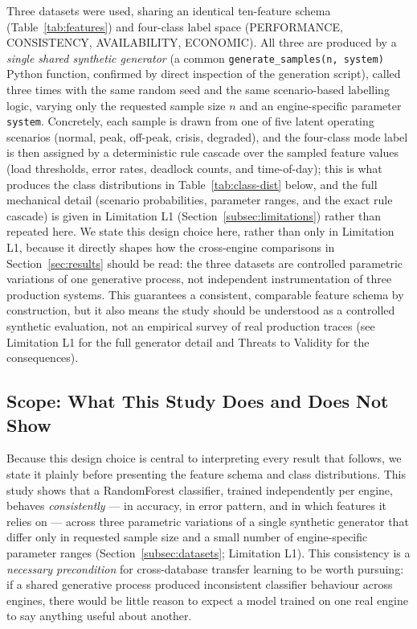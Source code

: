 \documentclass[iicol,pdflatex,sn-mathphys-num]{sn-jnl}
\theoremstyle{thmstyleone}
\theoremstyle{thmstylethree}
\begin{document}
Three datasets were used, sharing an identical ten-feature schema
(Table~\ref{tab:features}) and four-class label space (PERFORMANCE,
CONSISTENCY, AVAILABILITY, ECONOMIC). All three are produced by a
\emph{single shared synthetic generator} (a common
\texttt{generate\_samples(n, system)} Python function, confirmed by
direct inspection of the generation script), called three times with
the same random seed and the same scenario-based labelling logic,
varying only the requested sample size $n$ and an engine-specific
parameter \texttt{system}. Concretely, each sample is drawn from one
of five latent operating scenarios (normal, peak, off-peak, crisis,
degraded), and the four-class mode label is then assigned by a
deterministic rule cascade over the sampled feature values (load
thresholds, error rates, deadlock counts, and time-of-day); this is
what produces the class distributions in Table~\ref{tab:class-dist}
below, and the full mechanical detail (scenario probabilities,
parameter ranges, and the exact rule cascade) is given in Limitation
L1 (Section~\ref{subsec:limitations}) rather than repeated here. We
state this design choice here, rather than only in Limitation L1,
because it directly shapes how the
cross-engine comparisons in Section~\ref{sec:results} should be read:
the three datasets are controlled parametric variations of one
generative process, not independent instrumentation of three
production systems. This guarantees a consistent, comparable feature
schema by construction, but it also means the study should be
understood as a controlled synthetic evaluation, not an empirical
survey of real production traces (see Limitation L1 for the full
generator detail and Threats to Validity for the consequences).

\subsection{Scope: What This Study Does and Does Not Show}\label{subsec:scope}

Because this design choice is central to interpreting every result
that follows, we state it plainly before presenting the feature
schema and class distributions. This study shows that a RandomForest
classifier, trained independently per engine, behaves
\emph{consistently} --- in accuracy, in error pattern, and in which
features it relies on --- across three parametric variations of a
single synthetic generator that differ only in requested sample size
and a small number of engine-specific parameter ranges
(Section~\ref{subsec:datasets}; Limitation L1). This consistency is a
\emph{necessary precondition} for cross-database transfer learning to
be worth pursuing: if a shared generative process produced
inconsistent classifier behaviour across engines, there would be
little reason to expect a model trained on one real engine to say
anything useful about another.
\end{document}
